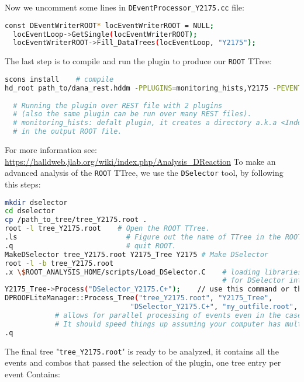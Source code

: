\documentclass{article}
\begin{document}
Now we uncomment some lines in \texttt{DEventProcessor\_Y2175.cc} file:

\begin{lstlisting}[language=bash]
  const DEventWriterROOT* locEventWriterROOT = NULL;             
  locEventLoop->GetSingle(locEventWriterROOT);
  locEventWriterROOT->Fill_DataTrees(locEventLoop, "Y2175");
\end{lstlisting}

The last step is to compile and run the plugin to produce our \texttt{ROOT} TTree:

\begin{lstlisting}[language=bash]
scons install    # compile
hd_root path_to/dana_rest.hddm -PPLUGINS=monitoring_hists,Y2175 -PEVENTS_TO_KEEP=10000
  
  # Running the plugin over REST file with 2 plugins 
  # (also the same plugin can be run over many REST files).
  # monitoring_hists: defalt plugin, it creates a directory a.k.a <Independant> 
  # in the output ROOT file.
\end{lstlisting}

For more information see: \url{https://halldweb.jlab.org/wiki/index.php/Analysis_DReaction}
\newline To make an advanced analysis of the \texttt{ROOT} TTree, we use the \texttt{DSelector} tool, by following this steps:

\begin{lstlisting}[language=bash]
mkdir dselector
cd dselector
cp /path_to_tree/tree_Y2175.root .
root -l tree_Y2175.root    # Open the ROOT TTree.
.ls                          # Figure out the name of TTree in the ROOT file.
.q                           # quit ROOT.
MakeDSelector tree_Y2175.root Y2175_Tree Y2175 # Make DSelector
root -l -b tree_Y2175.root             
.x \$ROOT_ANALYSIS_HOME/scripts/Load_DSelector.C    # loading libraries and environment
                                                    # for DSelector into ROOT
Y2175_Tree->Process("DSelector_Y2175.C+");    // use this command or the one below.
DPROOFLiteManager::Process_Tree("tree_Y2175.root", "Y2175_Tree",
                              "DSelector_Y2175.C+", "my_outfile.root", 2); //2 threads
            # allows for parallel processing of events even in the case of one TTree.
            # It should speed things up assuming your computer has multiple cores.
.q
\end{lstlisting}


The final tree "\texttt{tree\_Y2175.root}" is ready to be analyzed, it contains all the events and combos that passed the selection of the plugin, one tree entry per event Contains:
\end{document}
